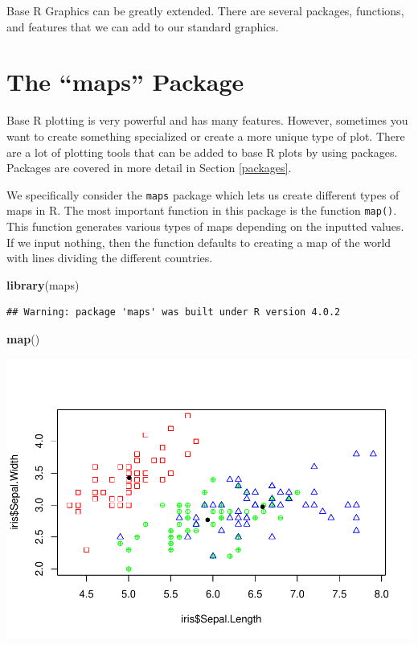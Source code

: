 \documentclass[
]{book}
\newenvironment{Shaded}{\begin{snugshade}}{\end{snugshade}}
\newcommand{\KeywordTok}[1]{\textcolor[rgb]{0.13,0.29,0.53}{\textbf{#1}}}
\newcommand{\NormalTok}[1]{#1}
\begin{document}
Base R Graphics can be greatly extended. There are several packages, functions, and features that we can add to our standard graphics.

\hypertarget{the-maps-package}{%
\section{The ``maps'' Package}\label{the-maps-package}}

Base R plotting is very powerful and has many features. However, sometimes you want to create something specialized or create a more unique type of plot. There are a lot of plotting tools that can be added to base R plots by using packages. Packages are covered in more detail in Section \ref{packages}.

We specifically consider the \texttt{maps} package which lets us create different types of maps in R. The most important function in this package is the function \texttt{map()}. This function generates various types of maps depending on the inputted values. If we input nothing, then the function defaults to creating a map of the world with lines dividing the different countries.

\begin{Shaded}
\begin{Highlighting}[]
\KeywordTok{library}\NormalTok{(maps)}
\end{Highlighting}
\end{Shaded}

\begin{verbatim}
## Warning: package 'maps' was built under R version 4.0.2
\end{verbatim}

\begin{Shaded}
\begin{Highlighting}[]
\KeywordTok{map}\NormalTok{()}
\end{Highlighting}
\end{Shaded}

\includegraphics{_main_files/figure-latex/unnamed-chunk-191-1.pdf}
\end{document}
